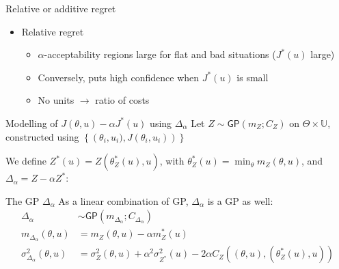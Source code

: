 \documentclass[10pt,aspectratio=169,usepdftitle=false]{beamer}
\newcommand\manupath{/home/victor/acadwriting/Manuscrit/Text/}
\newcommand{\Uspace}{\mathbb{U}}
\newcommand{\Kspace}{\Theta}
\newcommand{\GP}{\mathsf{GP}}
\newcommand{\kk}{\theta}
\newcommand{\uu}{u}
\begin{document}
\begin{frame}{Relative or additive regret}
 
  \renewcommand\rmfamily{\sffamily}
  \begin{center}
    \resizebox{.5\textwidth}{!}{}
  \end{center}
  \begin{itemize}
  \item Relative regret
    \begin{itemize}
    \item $\alpha$-acceptability regions large for flat and bad
      situations ($J^*(\uu)$ large)
    \item Conversely, puts high confidence when $J^*(\uu)$ is small
    \item No units $\rightarrow$ ratio of costs
    \end{itemize}
  \end{itemize}
\end{frame}

\begin{frame}{Modelling of $J(\kk, \uu) - \alpha J^*(\uu)$ using $\Delta_{\alpha}$}
  Let
  $Z \sim \GP\left(m_Z; C_Z\right) \text{ on } \Kspace \times \Uspace$, constructed using $\left\{\left(\kk_i,\uu_i), J(\kk_i, \uu_i)\right)\right\}$

  We define $Z^*(\uu)=Z(\kk^*_Z(\uu), \uu)$, with $\kk^*_Z(\uu) = \min_{\kk} m_Z(\kk, \uu)$,
  and $\Delta_{\alpha} = Z - \alpha Z^*$:
  \begin{block}{The GP $\Delta_\alpha$}
    As a linear combination of GP, $\Delta_{\alpha}$ is a GP as well:
  \begin{align}
    \Delta_{\alpha} &\sim \GP\left(m_{\Delta_{\alpha}};C_{\Delta_\alpha}\right) \\
    m_{\Delta_\alpha}(\kk,\uu)   &= m_Z(\kk, \uu) - \alpha m_Z^*(\uu) \\
    \sigma^2_{\Delta_\alpha}(\kk, \uu) &= \sigma^2_{Z}(\kk, \uu) +  {\alpha^2\sigma^2_{Z^*}(\uu)}- 2\alpha C_Z\left((\kk, \uu), ({\kk}_Z^ *(\uu), \uu)\right)
  \end{align}
\end{block}
\end{frame}
\end{document}
